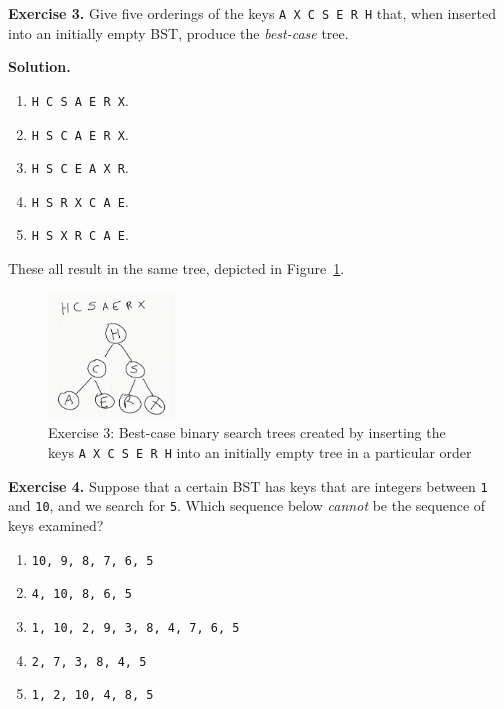 \documentclass[12pt, a4paper]{article}
\newenvironment{ex}[2][Exercise]
{\par\medskip\noindent \textbf{#1 #2.}}
{\medskip}
\newenvironment{sol}[1][Solution]
{\par\medskip\noindent \textbf{#1.} }
{\medskip}
\begin{document}
	\begin{ex}{3}
		Give five orderings of the keys \texttt{A X C S E R H} that, when inserted into an
		initially empty BST, produce the \emph{best-case} tree.
	\end{ex}
	\begin{sol}
		\begin{enumerate}[label=(\roman*)]
			\item \texttt{H C S A E R X}.
			\item \texttt{H S C A E R X}.
			\item \texttt{H S C E A X R}.
			\item \texttt{H S R X C A E}.
			\item \texttt{H S X R C A E}.
		\end{enumerate}
		These all result in the same tree, depicted in Figure~\ref{fig:ex-03}.
		\begin{figure}
			\centering
			\includegraphics[width=0.3\textwidth]{exercise-03}
			\caption{Exercise 3: Best-case binary search trees created by inserting the
				keys \texttt{A X C S E R H} into an initially empty tree in a particular order}
			\label{fig:ex-03}
		\end{figure}
	\end{sol}
	\begin{ex}{4}
		Suppose that a certain BST has keys that are integers between \texttt{1} and \texttt{10},
		and we search for \texttt{5}. Which sequence below \emph{cannot} be the sequence
		of keys examined?
		\begin{enumerate}[label=(\alph*)]
			\item \texttt{10, 9, 8, 7, 6, 5}
			\item \texttt{4, 10, 8, 6, 5}
			\item \texttt{1, 10, 2, 9, 3, 8, 4, 7, 6, 5}
			\item \texttt{2, 7, 3, 8, 4, 5}
			\item \texttt{1, 2, 10, 4, 8, 5}
		\end{enumerate}
	\end{ex}
\end{document}

